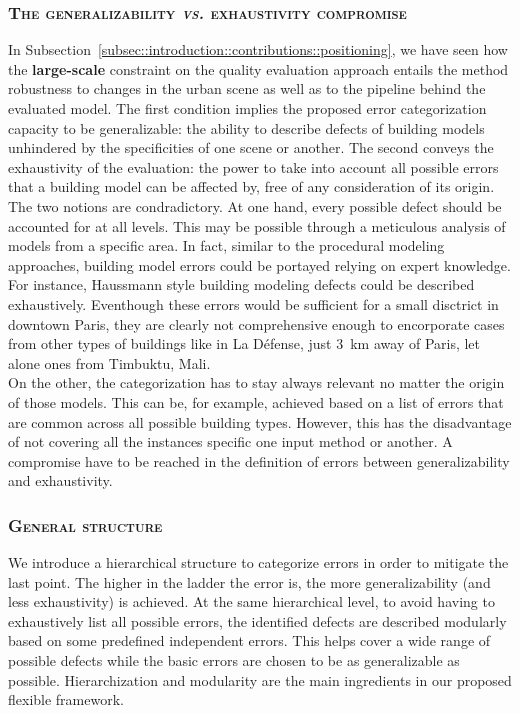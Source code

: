        \subsubsection{\textsc{The generalizability \textit{vs.} exhaustivity compromise}}
            In Subsection~\ref{subsec::introduction::contributions::positioning}, we have seen how the \textbf{large-scale} constraint on the quality evaluation approach entails the method robustness to changes in the urban scene as well as to the pipeline behind the evaluated model.
            The first condition implies the proposed error categorization capacity to be generalizable: the ability to describe defects of building models unhindered by the specificities of one scene or another.
            The second conveys the exhaustivity of the evaluation: the power to take into account all possible errors that a building model can be affected by, free of any consideration of its origin.\\

            The two notions are condradictory.
            At one hand, every possible defect should be accounted for at all levels.
            This may be possible through a meticulous analysis of models from a specific area.
            In fact, similar to the procedural modeling approaches, building model errors could be portayed relying on expert knowledge.
            For instance, Haussmann style building modeling defects could be described exhaustively.
            Eventhough these errors would be sufficient for a small disctrict in downtown Paris, they are clearly not comprehensive enough to encorporate cases from other types of buildings like in La D\'efense, just \SI{3}{\km} away of Paris, let alone ones from Timbuktu, Mali.\\

            On the other, the categorization has to stay always relevant no matter the origin of those models.
            This can be, for example, achieved based on a list of errors that are common across all possible building types.
            However, this has the disadvantage of not covering all the instances specific one input method or another.
            A compromise have to be reached in the definition of errors between generalizability and exhaustivity.
        
        \subsubsection{\textsc{General structure}}
            We introduce a hierarchical structure to categorize errors in order to mitigate the last point.
            The higher in the ladder the error is, the more generalizability (and less exhaustivity) is achieved.
            At the same hierarchical level, to avoid having to exhaustively list all possible errors, the identified defects are described modularly based on some predefined independent errors.
            This helps cover a wide range of possible defects while the basic errors are chosen to be as generalizable as possible.
            Hierarchization and modularity are the main ingredients in our proposed flexible framework.\\


